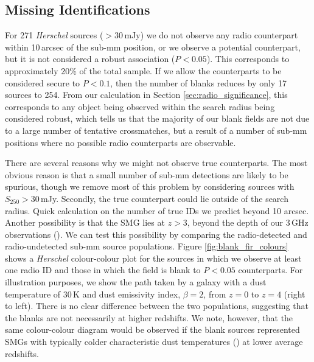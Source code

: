 \subsection{Missing Identifications}

For 271 \textit{Herschel} sources ($> 30\,$mJy) we do not observe any radio counterpart within 10\,arcsec of the sub-mm position, or we observe a potential counterpart, but it is not considered a robust association ($P < 0.05$). This corresponds to approximately 20\% of the total sample. If we allow the counterparts to be considered secure to $P < 0.1$, then the number of blanks reduces by only 17 sources to 254. From our calculation in Section \ref{sec:radio_significance}, this corresponds to any object being observed within the search radius being considered robust, which tells us that the majority of our blank fields are not due to a large number of tentative crossmatches, but a result of a number of sub-mm positions where no possible radio counterparts are observable.

There are several reasons why we might not observe true counterparts. The most obvious reason is that a small number of sub-mm detections are likely to be spurious, though we remove most of this problem by considering sources with $S_{250} > 30\,$mJy. Secondly, the true counterpart could lie outside of the search radius. {\color{red}Quick calculation on the number of true IDs we predict beyond 10 arcsec.} Another possibility is that the SMG lies at $z > 3$, beyond the depth of our 3\,GHz observations (\citealt{Eales_2003}). We can test this possibility by comparing the radio-detected and radio-undetected sub-mm source populations. Figure \ref{fig:blank_fir_colours} shows a \textit{Herschel} colour-colour plot for the sources in which we observe at least one radio ID and those in which the field is blank to $P < 0.05$ counterparts. For illustration purposes, we show the path taken by a galaxy with a dust temperature of 30\,K and dust emissivity index, $\beta = 2$, from $z = 0$ to $z = 4$ (right to left). There is no clear difference between the two populations, suggesting that the blanks are not necessarily at higher redshifts. We note, however, that the same colour-colour diagram would be observed if the blank sources represented SMGs with typically colder characteristic dust temperatures (\citealt{Chapman_2004}) at lower average redshifts.

